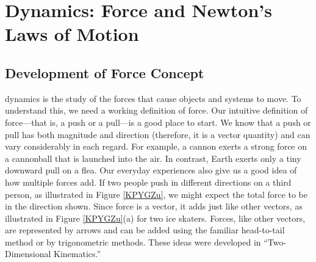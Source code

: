 \documentclass[../../main-ap-physics.tex]{subfiles}
\begin{document}
\section{Dynamics: Force and Newton's Laws of Motion}

\subsection{Development of Force Concept}

\Gls{dynamics} is the study of the forces that cause objects and systems to move. To understand this, we need a working definition of \gls{force}. Our intuitive definition of force---that is, a push or a pull---is a good place to start. We know that a push or pull has both magnitude and direction (therefore, it is a vector quantity) and can vary considerably in each regard. For example, a cannon exerts a strong force on a cannonball that is launched into the air. In contrast, Earth exerts only a tiny downward pull on a flea. Our everyday experiences also give us a good idea of how multiple forces add. If two people push in different directions on a third person, as illustrated in Figure \ref{KPYGZu}, we might expect the total force to be in the direction shown. Since force is a vector, it adds just like other vectors, as illustrated in Figure \ref{KPYGZu}(a) for two ice skaters. Forces, like other vectors, are represented by arrows and can be added using the familiar head-to-tail method or by trigonometric methods. These ideas were developed in ``Two-Dimensional Kinematics.''
\end{document}
